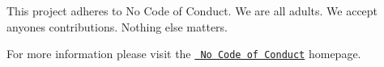 This project adheres to No Code of Conduct. We are all adults. We accept anyone\textquotesingle{}s contributions. Nothing else matters.

For more information please visit the \href{https://github.com/domgetter/NCoC}{\texttt{ No Code of Conduct}} homepage. 
